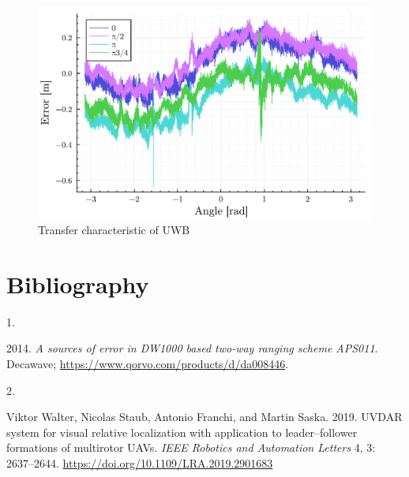 \documentclass[twoside]{ctustyle/ctuthesis}
\theoremstyle{plain}
\theoremstyle{definition}
\theoremstyle{note}
\newlength{\cslhangindent}
\newlength{\csllabelwidth}
\newlength{\cslentryspacingunit} %
\newenvironment{CSLReferences}[2] %
 {%
  \setlength{\parindent}{0pt}
  \ifodd #1
  \let\oldpar\par
  \def\par{\hangindent=\cslhangindent\oldpar}
  \fi
  \setlength{\parskip}{#2\cslentryspacingunit}
 }%
 {}
\newcommand{\CSLLeftMargin}[1]{\parbox[t]{\csllabelwidth}{#1}}
\newcommand{\CSLRightInline}[1]{\parbox[t]{\linewidth - \csllabelwidth}{#1}\break}
\begin{document}
\begin{figure}

{\centering \includegraphics{sections/experiments_files/figure-pdf/fig-angle-output-1.pdf}

}

\caption{\label{fig-angle}Transfer characteristic of UWB}

\end{figure}


\hypertarget{bibliography}{%
\chapter*{Bibliography}\label{bibliography}}


\appendix

\hypertarget{refs}{}
\begin{CSLReferences}{0}{0}
\leavevmode{}%
\CSLLeftMargin{1. }%
\CSLRightInline{2014. \emph{A sources of error in DW1000 based two-way
ranging scheme APS011}. Decawave;
\url{https://www.qorvo.com/products/d/da008446}.}

\leavevmode{}%
\CSLLeftMargin{2. }%
\CSLRightInline{Viktor Walter, Nicolas Staub, Antonio Franchi, and
Martin Saska. 2019. UVDAR system for visual relative localization with
application to leader--follower formations of multirotor UAVs.
\emph{IEEE Robotics and Automation Letters} 4, 3: 2637--2644.
\url{https://doi.org/10.1109/LRA.2019.2901683}}

\end{CSLReferences}





% 
% 
\end{document}
